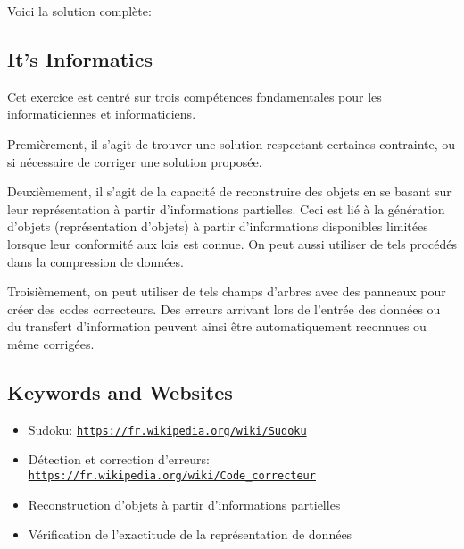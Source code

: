 \documentclass[a4paper,11pt]{report}
\newcommand{\BrochureUrlText}[1]{\texttt{#1}}
\newcommand{\taskGraphicsFolder}{..}
\begin{document}
Voici la solution complète:

{\centering%
\par}


\subsection*{It’s Informatics}

Cet exercice est centré sur trois compétences fondamentales pour les informaticiennes et informaticiens.

Premièrement, il s’agit de trouver une solution respectant certaines contrainte, ou si nécessaire de corriger une solution proposée.

Deuxièmement, il s’agit de la capacité de reconstruire des objets en se basant sur leur représentation à partir d’informations partielles. Ceci est lié à la génération d’objets (représentation d’objets) à partir d’informations disponibles limitées lorsque leur conformité aux lois est connue. On peut aussi utiliser de tels procédés dans la compression de données.

Troisièmement, on peut utiliser de tels champs d’arbres avec des panneaux pour créer des codes correcteurs. Des erreurs arrivant lors de l’entrée des données ou du transfert d’information peuvent ainsi être automatiquement reconnues ou même corrigées.

{\raggedright

\subsection*{Keywords and Websites}

\begin{itemize}
  \item Sudoku: \href{https://fr.wikipedia.org/wiki/Sudoku}{\BrochureUrlText{https://fr.wikipedia.org/wiki/Sudoku}}
  \item Détection et correction d’erreurs: \href{https://fr.wikipedia.org/wiki/Code_correcteur}{\BrochureUrlText{https://fr.wikipedia.org/wiki/Code\_correcteur}}
  \item Reconstruction d’objets à partir d’informations partielles
  \item Vérification de l’exactitude de la représentation de données
\end{itemize}


}
\end{document}
